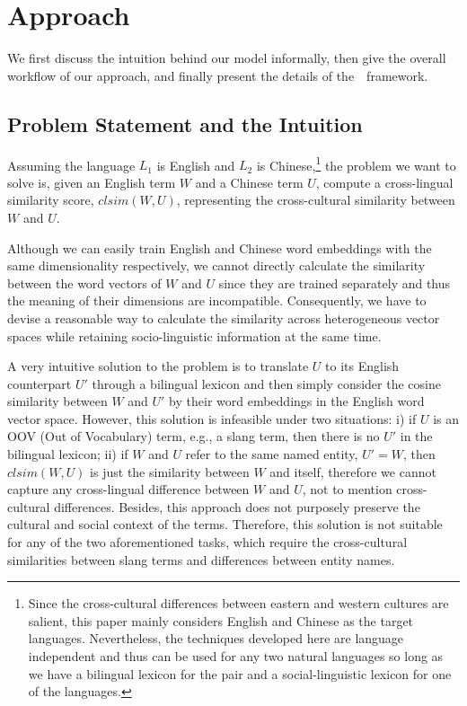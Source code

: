 \section{Approach}
\label{sec:socvec}
We first discuss the intuition behind our model informally, then give the overall workflow of our approach, and finally present the details of the~\textit{\socvec}~framework. 

\subsection{Problem Statement and the Intuition}
Assuming the language $L_1$ is English and $L_2$ is Chinese,\footnote{Since the cross-cultural differences between eastern and western cultures are salient, 
this paper mainly considers English and Chinese as the target languages. 
Nevertheless, the techniques developed here are language independent and 
thus can be used for any two natural languages so long as 
we have a bilingual lexicon for the pair and a social-linguistic lexicon 
for one of the languages.} the problem we want to solve is, given 
an English term $W$ and a Chinese term $U$, compute a cross-lingual 
similarity score, $clsim(W, U)$, representing the cross-cultural 
similarity between $W$ and $U$. 

Although we can easily train English and Chinese word embeddings 
with the same dimensionality respectively, we cannot directly calculate 
the similarity between the word vectors of $W$ and $U$ since they 
are trained separately and thus the meaning of their dimensions 
are incompatible.
Consequently, we have to devise a reasonable way to calculate the 
similarity across heterogeneous vector spaces while retaining 
socio-linguistic information at the same time. 

A very intuitive solution to the problem is to translate $U$ to its English 
counterpart $U'$ through a bilingual lexicon and then simply consider 
the cosine similarity between $W$ and $U'$ by their word embeddings 
in the English word vector space.
However, this solution is infeasible under two situations: 
i) if $U$ is an OOV (Out of Vocabulary) term, e.g., a slang term, 
then there is no $U'$ in the bilingual lexicon; 
ii) if $W$ and $U$ refer to the same named entity, $U' = W$, 
then $clsim(W, U)$ is just the similarity between $W$ and itself, 
therefore we cannot capture any cross-lingual difference between 
$W$ and $U$, not to mention cross-cultural differences. 
Besides, this approach does not purposely preserve the 
cultural and social context of the terms. 
Therefore, this solution is not suitable for any of the two aforementioned 
tasks, which require the cross-cultural similarities between slang terms 
and differences between entity names.

